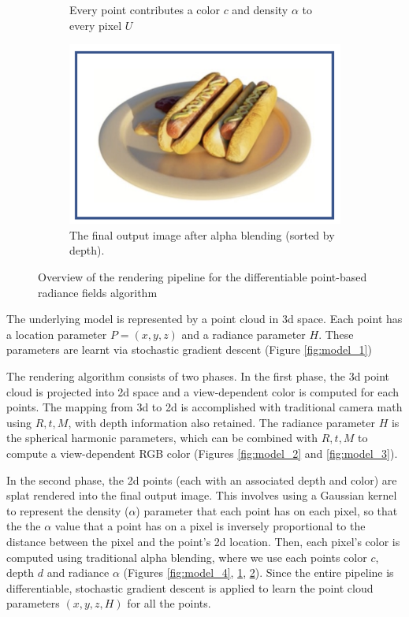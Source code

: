 \documentclass[10pt,twocolumn,letterpaper]{article}
\begin{document}
\begin{figure}
\begin{subfigure}[b]{0.32\textwidth}
        \caption{Every point contributes a color $c$ and density $\alpha$ to every pixel $U$}
        \label{fig:model_5}
    \end{subfigure}
    \hfill
    \begin{subfigure}[b]{0.32\textwidth}  
        \includegraphics[width=\textwidth]{figures/model_6.png}
        \caption{The final output image after alpha blending (sorted by depth). }
        \label{fig:model_6}
    \end{subfigure}
    \hfill
    \caption{Overview of the rendering pipeline for the differentiable point-based radiance fields algorithm} 
    \label{fig:model_1to6}
\end{figure}


The underlying model is represented by a point cloud in 3d space. Each point has a location parameter $P = (x, y, z)$ and a radiance parameter $H$. These parameters are learnt via stochastic gradient descent (Figure \ref{fig:model_1})

The rendering algorithm consists of two phases. In the first phase, the 3d point cloud is projected into 2d space and a view-dependent color is computed for each points. The mapping from 3d to 2d is accomplished with traditional camera math using $R, t, M$, with depth information also retained. The radiance parameter $H$ is the spherical harmonic parameters, which can be combined with $R, t, M$ to compute a view-dependent RGB color (Figures \ref{fig:model_2} and \ref{fig:model_3}).

In the second phase, the 2d points (each with an associated depth and color) are splat rendered into the final output image. This involves using a Gaussian kernel to represent the density ($\alpha$) parameter that each point has on each pixel, so that the the $\alpha$ value that a point has on a pixel is inversely proportional to the distance between the pixel and the point's 2d location. Then, each pixel's color is computed using traditional alpha blending, where we use each points color $c$, depth $d$ and radiance $\alpha$ (Figures \ref{fig:model_4}, \ref{fig:model_5}, \ref{fig:model_6}). Since the entire pipeline is differentiable, stochastic gradient descent is applied to learn the point cloud parameters $(x, y, z, H)$ for all the points.
\end{document}
